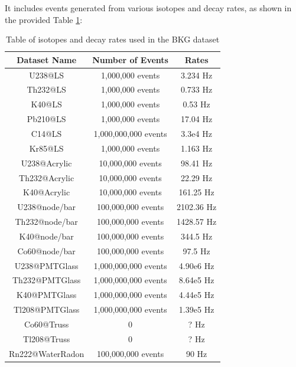 It includes events generated from various isotopes and decay rates, as shown in the provided Table \ref{tab:BKG_gen}:

\begin{small}
\begin{table}[htp]
	\centering
	\begin{tabular}{ccc}
		\toprule
		\textbf{Dataset Name}  & \textbf{Number of Events}  & \textbf{Rates}   \\\midrule
		U238@LS      &   1,000,000 events    &           3.234 Hz            \\
		Th232@LS      &   1,000,000 events    &           0.733 Hz            \\
		K40@LS       &   1,000,000 events    &           0.53 Hz             \\
		Pb210@LS      &   1,000,000 events    &           17.04 Hz            \\
		C14@LS       & 1,000,000,000 events  &           3.3e4 Hz            \\
		Kr85@LS      &   1,000,000 events    &           1.163 Hz            \\
		U238@Acrylic    &   10,000,000 events   &           98.41 Hz            \\
		Th232@Acrylic   &   10,000,000 events   &           22.29 Hz            \\
		K40@Acrylic    &   10,000,000 events   &          161.25 Hz            \\
		U238@node/bar   &  100,000,000 events   &          2102.36 Hz           \\
		Th232@node/bar   &  100,000,000 events   &          1428.57 Hz           \\
		K40@node/bar    &  100,000,000 events   &           344.5 Hz            \\
		Co60@node/bar   &  100,000,000 events   &           97.5 Hz             \\
		U238@PMTGlass   & 1,000,000,000 events  &          4.90e6 Hz            \\
		Th232@PMTGlass   & 1,000,000,000 events  &          8.64e5 Hz            \\
		K40@PMTGlass    & 1,000,000,000 events  &          4.44e5 Hz            \\
		Tl208@PMTGlass   & 1,000,000,000 events  &          1.39e5 Hz            \\
		Co60@Truss     &           0           &             ? Hz              \\
		Tl208@Truss    &           0           &             ? Hz              \\
		Rn222@WaterRadon  &  100,000,000 events   &            90 Hz              \\
		\bottomrule
	\end{tabular}
	\caption{Table of isotopes and decay rates used in the BKG dataset}
	\label{tab:BKG_gen}
\end{table}
\end{small}

